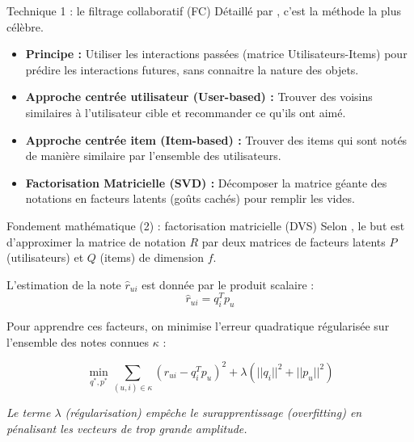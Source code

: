 \documentclass[9pt, aspectratio=169]{beamer}
\begin{document}
\begin{frame}{Technique 1 : le filtrage collaboratif (FC)}
    Détaillé par \textcite{Koren2009}, c'est la méthode la plus célèbre.
    \begin{itemize}
        \item \textbf{Principe :} Utiliser les interactions passées (matrice Utilisateurs-Items) pour prédire les interactions futures, sans connaitre la nature des objets.
        \item \textbf{Approche centrée utilisateur (User-based) :} Trouver des voisins similaires à l'utilisateur cible et recommander ce qu'ils ont aimé.
        \item \textbf{Approche centrée item (Item-based) :} Trouver des items qui sont notés de manière similaire par l'ensemble des utilisateurs.
        \item \textbf{Factorisation Matricielle (SVD) :} Décomposer la matrice géante des notations en facteurs latents (goûts cachés) pour remplir les vides.
    \end{itemize}
\end{frame}

\begin{frame}{Fondement mathématique (2) : factorisation matricielle (DVS)}
    Selon \textcite{Koren2009}, le but est d'approximer la matrice de notation \(R\) par deux matrices de facteurs latents \(P\) (utilisateurs) et \(Q\) (items) de dimension \(f\).
    
    L'estimation de la note \(\hat{r}_{ui}\) est donnée par le produit scalaire :
    \[ \hat{r}_{ui} = q_i^T p_u \]
    
    Pour apprendre ces facteurs, on minimise l'erreur quadratique régularisée sur l'ensemble des notes connues \(\kappa\) :
    
    \begin{equation}
        \min_{q^*, p^*} \sum_{(u,i) \in \kappa} (r_{ui} - q_i^T p_u)^2 + \lambda(||q_i||^2 + ||p_u||^2)
    \end{equation}
    
    \footnotesize
    \textit{Le terme \(\lambda\) (régularisation) empêche le surapprentissage (overfitting) en pénalisant les vecteurs de trop grande amplitude.}
\end{frame}
\end{document}
